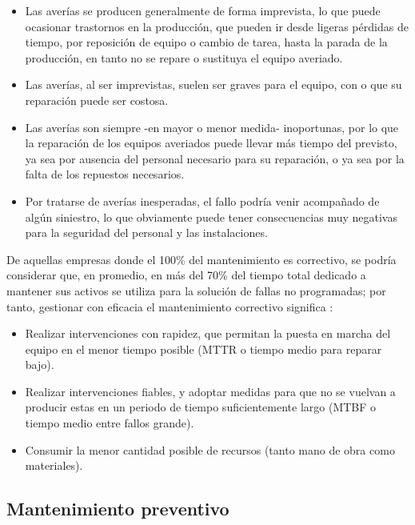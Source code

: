 \begin{itemize}
\item Las averías se producen generalmente de forma imprevista, lo que puede ocasionar trastornos en la producción, que pueden ir desde ligeras pérdidas de tiempo, por reposición de equipo o cambio de tarea, hasta la parada de la producción, en tanto no se repare o sustituya el equipo averiado.
\item Las averías, al ser imprevistas, suelen ser graves para el equipo, con o que su reparación puede ser costosa.
\item Las averías son siempre -en mayor o menor medida- inoportunas, por lo que la reparación de los equipos averiados puede llevar más tiempo del previsto, ya sea por ausencia del personal necesario para su reparación, o ya sea por la falta de los repuestos necesarios.
\item Por tratarse de averías inesperadas, el fallo podría venir acompañado de algún siniestro, lo que obviamente puede tener consecuencias muy negativas para la seguridad del personal y las instalaciones.
\end{itemize}

De aquellas empresas donde el 100\% del mantenimiento es correctivo, se podría considerar que, en promedio, en más del 70\% del tiempo total dedicado a mantener sus activos se utiliza para la solución de fallas no programadas; por tanto, gestionar con eficacia el mantenimiento correctivo significa \citep{garcia2010}:

\begin{itemize}
\item Realizar intervenciones con rapidez, que permitan la puesta en marcha del equipo en el menor tiempo posible (MTTR o tiempo medio para reparar bajo).
\item Realizar intervenciones fiables, y adoptar medidas para que no se vuelvan a producir estas en un periodo de tiempo suficientemente largo (MTBF o tiempo medio entre fallos grande).
\item Consumir la menor cantidad posible de recursos (tanto mano de obra como materiales).
\end{itemize}

\subsection{Mantenimiento preventivo}

